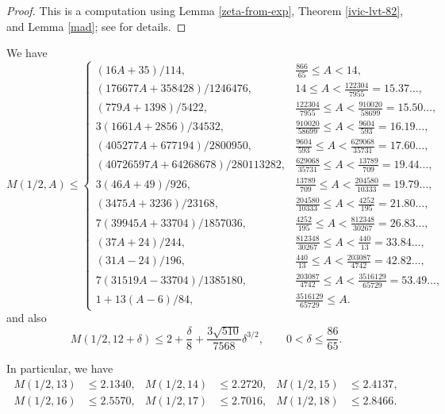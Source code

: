 \begin{proof} This is a computation using Lemma \ref{zeta-from-exp}, Theorem \ref{ivic-lvt-82}, and Lemma \ref{mad}; see \cite{ivic} for details.
\end{proof}

\begin{theorem}[Moment bounds for $\sigma=1/2$]\label{M_bound_larger_A}\cite[Theorems 2.1, 2.2]{trudgian-yang}
    We have
    \[
    M(1/2, A) \leq \begin{cases}
        (16A + 35)/114 ,& \frac{866}{65} \leq A < 14, \\
         (176677A + 358428)/1246476 ,& 14 \leq A < \frac{122304}{7955} = 15.37\ldots, \\
         (779A + 1398)/5422 ,& \frac{122304}{7955} \leq A < \frac{910020}{58699} = 15.50\ldots, \\
         3(1661A + 2856)/34532 ,& \frac{910020}{58699} \leq A < \frac{9604}{593} = 16.19\ldots, \\
         (405277A + 677194)/2800950 ,& \frac{9604}{593} \leq A < \frac{629068}{35731} = 17.60\ldots, \\
         (40726597A + 64268678)/280113282 ,& \frac{629068}{35731} \leq A < \frac{13789}{709} = 19.44\ldots, \\
         3(46A + 49)/926 ,& \frac{13789}{709} \leq A < \frac{204580}{10333} = 19.79\ldots,\\
         (3475A + 3236)/23168 ,& \frac{204580}{10333} \leq A < \frac{4252}{195} = 21.80\ldots, \\
         7(39945A + 33704)/1857036 ,& \frac{4252}{195} \leq A < \frac{812348}{30267} = 26.83\ldots, \\
         (37A + 24)/244 ,& \frac{812348}{30267} \leq A < \frac{440}{13} = 33.84\ldots, \\
         (31A - 24)/196 ,& \frac{440}{13} \leq A < \frac{203087}{4742} = 42.82\ldots, \\
         7(31519A - 33704)/1385180 ,& \frac{203087}{4742} \leq A < \frac{3516129}{65729} = 53.49\ldots, \\
        1 + 13(A - 6)/84 ,& \frac{3516129}{65729} \leq A.
    \end{cases}
    \]
   and also
   \[
    M(1/2, 12 + \delta) \le 2 + \frac{\delta}{8} + \frac{3\sqrt{510}}{7568}\delta^{3/2},\qquad 0 < \delta \le \frac{86}{65}.
    \]
\end{theorem}
    In particular, we have
    \begin{align*}
    M(1/2,13) &\le 2.1340,&M(1/2,14) &\le 2.2720,&M(1/2,15) &\le 2.4137,\\
    M(1/2,16) &\le 2.5570,&M(1/2,17) &\le 2.7016,&M(1/2,18) &\le 2.8466.
\end{align*}


